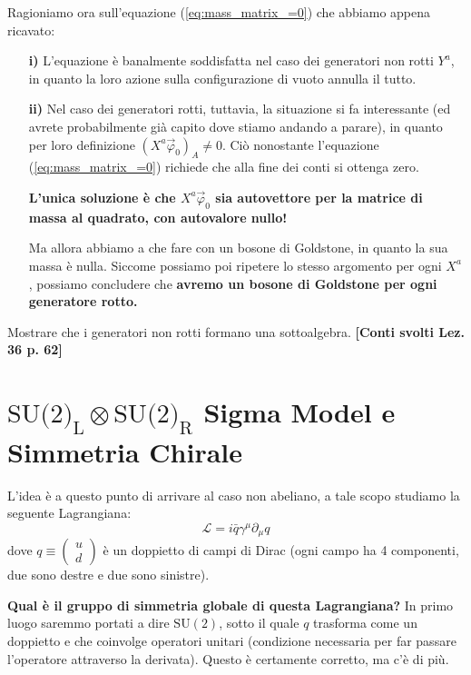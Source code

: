 \documentclass[../main.tex]{subfiles}
\begin{document}
Ragioniamo ora sull'equazione (\ref{eq:mass_matrix_=0}) che abbiamo appena ricavato:
\begin{enumerate}
    \item[\textbf{i)}] L'equazione è banalmente soddisfatta nel caso dei generatori non rotti $Y^a$, in quanto la loro azione sulla configurazione di vuoto annulla il tutto.
    \item[\textbf{ii)}] Nel caso dei generatori rotti, tuttavia, la situazione si fa interessante (ed avrete probabilmente già capito dove stiamo andando a parare), in quanto per loro definizione $(X^a\Vec{\varphi}_0)_A \neq0$. Ciò nonostante l'equazione (\ref{eq:mass_matrix_=0}) richiede che alla fine dei conti si ottenga zero.

    \textbf{L'unica soluzione è che $X^a\Vec{\varphi}_0$ sia autovettore per la matrice di massa al quadrato, con autovalore nullo!}

    Ma allora abbiamo a che fare con un bosone di Goldstone, in quanto la sua massa è nulla. Siccome possiamo poi ripetere lo stesso argomento per ogni $X^a$, possiamo concludere che \textbf{avremo un bosone di Goldstone per ogni generatore rotto.}
\end{enumerate}
\begin{exercise}
    Mostrare che i generatori non rotti formano una sottoalgebra. \textbf{[Conti svolti Lez. 36 p. 62]}
\end{exercise}

\section[Simmetria Chirale]{$\text{SU}\text{(2)}_\text{L}\otimes \text{SU}\text{(2)}_\text{R}$ Sigma Model e Simmetria Chirale}
L'idea è a questo punto di arrivare al caso non abeliano, a tale scopo studiamo la seguente Lagrangiana:
\begin{equation}
    \boxed{\mathscr{L} = i\bar q\gamma^\mu\partial_\mu q}
    \label{eq:simplest_doublet_lagrangian}
\end{equation}
dove $q \equiv \begin{pmatrix}u\\d\end{pmatrix}$ è un doppietto di campi di Dirac (ogni campo ha 4 componenti, due sono destre e due sono sinistre).

\textbf{Qual è il gruppo di simmetria globale di questa Lagrangiana?} In primo luogo saremmo portati a dire $\textrm{SU}(2)$, sotto il quale $q$ trasforma come un doppietto e che coinvolge operatori unitari (condizione necessaria per far passare l'operatore attraverso la derivata). Questo è certamente corretto, ma c'è di più.
\end{document}
